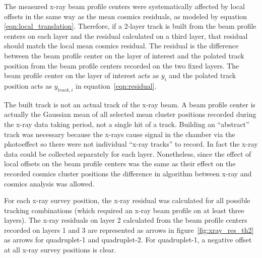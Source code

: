 The measured x-ray beam profile centers were systematically affected by local offsets in the same way as the mean cosmics residuals, as modeled by equation \ref{eqn:local_translation}. Therefore, if a 2-layer track is built from the beam profile centers on each layer and the residual calculated on a third layer, that residual should match the local mean cosmics residual. The residual is the difference between the beam profile center on the layer of interest and the polated track position from the beam profile centers recorded on the two fixed layers. The beam profile center on the layer of interest acts as $y_{i}$ and the polated track position acts as $y_{track, i}$ in equation~\ref{eqn:residual}.

The built track is not an actual track of the x-ray beam. A beam profile center is actually the Gaussian mean of all selected mean cluster positions recorded during the x-ray data taking period, not a single hit of a track. Building an ``abstract'' track was necessary because the x-rays cause signal in the chamber via the photoeffect so there were not individual ``x-ray tracks'' to record. In fact the x-ray data could be collected separately for each layer. Nonetheless, since the effect of local offsets on the beam profile centers was the same as their effect on the recorded cosmics cluster positions the difference in algorithm between x-ray and cosmics analysis was allowed. 

For each x-ray survey position, the x-ray residual was calculated for all possible tracking combinations (which required an x-ray beam profile on at least three layers). The x-ray residuals on layer 2 calculated from the beam profile centers recorded on layers 1 and 3 are represented as arrows in figure~\ref{fig:xray_res_th2} as arrows for quadruplet-1 and quadruplet-2.  For quadruplet-1, a negative offset at all x-ray survey positions is clear. %

